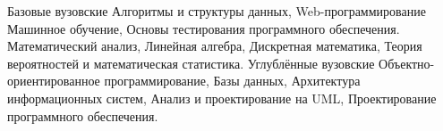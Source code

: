 \documentclass[9pt]{developercv} %
\begin{document}
\vspace{-10 pt}
\begin{entrylist}
	\entry
        {Базовые вузовские}
		{}
		{}
        {Алгоритмы и структуры данных, Web-программирование Машинное обучение, Основы тестирования программного обеспечения.
        Математический анализ, Линейная алгебра, Дискретная математика, Теория вероятностей и математическая статистика.}
	\entry
		{Углублённые вузовские}
        {}
		{}
		{Объектно-ориентированное программирование, Базы данных, Архитектура информационных систем,
Анализ и проектирование на UML, Проектирование программного обеспечения.}
	

\end{entrylist}
\end{document}
